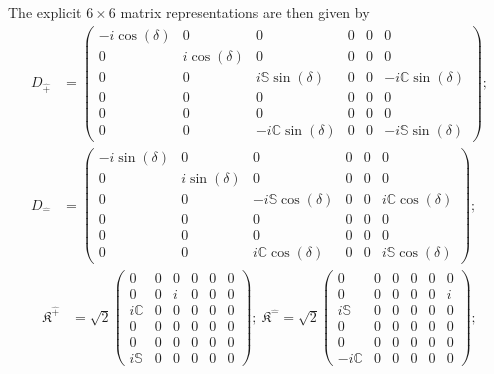 \documentclass[%
 reprint,
superscriptaddress,
 amsmath,amssymb,
 aps,
]{revtex4-2}
\begin{document}
The explicit $6\times6$ matrix representations are then given by %
\begin{align}
    D_{\hat{+}}&=\begin{pmatrix}
        -i\cos{(\delta)}&0&0&0&0&0\\
        0&i\cos{(\delta)}&0&0&0&0\\
        0&0&i\mathbb{S}\sin{(\delta)}&0&0&-i\mathbb{C}\sin{(\delta)}\\
        0&0&0&0&0&0\\
        0&0&0&0&0&0\\
        0&0&-i\mathbb{C}\sin{(\delta)}&0&0&-i\mathbb{S}\sin{(\delta)}
    \end{pmatrix};\nonumber\\
    D_{\hat{-}}&=\begin{pmatrix}
        -i\sin{(\delta)}&0&0&0&0&0\\
        0&i\sin{(\delta)}&0&0&0&0\\
        0&0&-i\mathbb{S}\cos{(\delta)}&0&0&i\mathbb{C}\cos{(\delta)}\\
        0&0&0&0&0&0\\
        0&0&0&0&0&0\\
        0&0&i\mathbb{C}\cos{(\delta)}&0&0&i\mathbb{S}\cos{(\delta)}
    \end{pmatrix};\nonumber
\end{align}
\begin{align}
    \mathfrak{K}^{\hat{+}}&=\sqrt{2}\begin{pmatrix}
        0&0&0&0&0&0\\
        0&0&i&0&0&0\\
        i\mathbb{C}&0&0&0&0&0\\
        0&0&0&0&0&0\\
        0&0&0&0&0&0\\
        i\mathbb{S}&0&0&0&0&0
    \end{pmatrix};
    ~\mathfrak{K}^{\hat{-}}=\sqrt{2}\begin{pmatrix}
        0&0&0&0&0&0\\
        0&0&0&0&0&i\\
        i\mathbb{S}&0&0&0&0&0\\
        0&0&0&0&0&0\\
        0&0&0&0&0&0\\
        -i\mathbb{C}&0&0&0&0&0
    \end{pmatrix};\nonumber
    \end{align}
\end{document}
